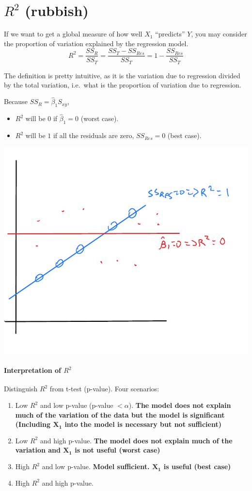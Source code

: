\documentclass[12 pt]{article}
\begin{document}
    \section{$R^2$ (rubbish)}
    If we want to get a global measure of how well $X_1$ ``predicts''
    $Y$, you may consider the proportion of variation explained by the
    regression model.
    $$R^2 = \frac{SS_R}{SS_T} = \frac{SS_T - SS_{Res}}{SS_T} = 1 -
    \frac{SS_{Res}}{SS_T}$$

    The definition is pretty intuitive, as it is the variation due to
    regression divided by the total variation, i.e.\ what is the
    proportion of variation due to regression.

    Because $SS_R = \hat{\beta}_1 S_{xy}$,
    \begin{itemize}
    \item $R^2$ will be $0$ if $\hat{\beta}_1 = 0$ (worst case).
    \item $R^2$ will be $1$ if all the residuals are zero, $SS_{Res} =
      0$ (best case).
    \end{itemize}
    \includegraphics[width=.5\textwidth]{24.pdf}
    \paragraph{Interpretation of $R^2$}
    Distinguish $R^2$ from t-test (p-value). Four scenarios:
    \begin{enumerate}
    \item Low $R^2$ and low p-value (p-value $< \alpha$). \textbf{The
        model does not explain much of the variation of the data but the
        model is significant (Including $\mathbf{X_1}$ into the model is
        necessary but not sufficient)}
    \item Low $R^2$ and high p-value. \textbf{The model does not
        explain much of the variation and $\mathbf{X_1}$ is not useful
      (worst case)}
  \item High $R^2$ and low p-value. \textbf{Model
      sufficient. $\mathbf{X_1}$ is useful (best case)}
  \item High $R^2$ and high p-value.
  \end{enumerate}
\end{document}
